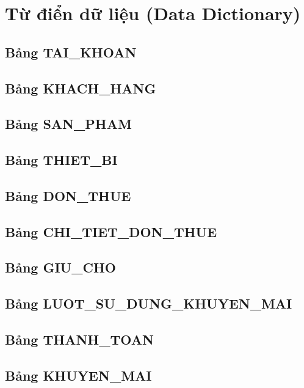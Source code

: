 
\section{Từ điển dữ liệu (Data Dictionary)}
\label{sec:data_dict}

\subsection{Bảng TAI\_KHOAN}

\subsection{Bảng KHACH\_HANG}

\subsection{Bảng SAN\_PHAM}

\subsection{Bảng THIET\_BI}

\subsection{Bảng DON\_THUE}
\label{subsec:don_thue}

\subsection{Bảng CHI\_TIET\_DON\_THUE}

\subsection{Bảng GIU\_CHO}

\subsection{Bảng LUOT\_SU\_DUNG\_KHUYEN\_MAI}

\subsection{Bảng THANH\_TOAN}

\subsection{Bảng KHUYEN\_MAI}

